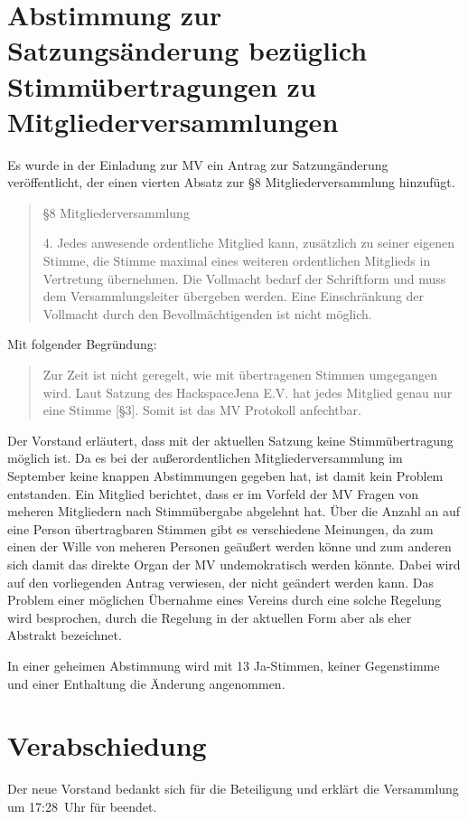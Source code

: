 \documentclass[DIV=calc,parksip=half*]{scrartcl}
\begin{document}
\section{Abstimmung zur Satzungsänderung bezüglich Stimmübertragungen zu Mitgliederversammlungen}
Es wurde in der Einladung zur MV ein Antrag zur Satzungänderung veröffentlicht, der einen vierten Absatz zur §8 Mitgliederversammlung hinzufügt.

\begin{quote}
§8 Mitgliederversammlung

4. Jedes anwesende ordentliche Mitglied kann, zusätzlich zu seiner eigenen Stimme, die Stimme maximal eines weiteren ordentlichen Mitglieds in Vertretung übernehmen.
Die Vollmacht bedarf der Schriftform und muss dem Versammlungsleiter übergeben werden.
Eine Einschränkung der Vollmacht durch den Bevollmächtigenden ist nicht möglich.
\end{quote}

Mit folgender Begründung: 
\begin{quote}
Zur Zeit ist nicht geregelt, wie mit übertragenen Stimmen umgegangen wird. Laut Satzung des HackspaceJena E.V. hat jedes Mitglied genau nur eine Stimme [§3]. Somit ist das MV Protokoll anfechtbar.
\end{quote}

Der Vorstand erläutert, dass mit der aktuellen Satzung keine Stimmübertragung möglich ist. Da es bei der außerordentlichen Mitgliederversammlung im September keine knappen Abstimmungen gegeben hat, ist damit kein Problem entstanden. Ein Mitglied berichtet, dass er im Vorfeld der MV Fragen von meheren Mitgliedern nach Stimmübergabe abgelehnt hat. Über die Anzahl an auf eine Person übertragbaren Stimmen gibt es verschiedene Meinungen, da zum einen der Wille von meheren Personen geäußert werden könne und zum anderen sich damit das direkte Organ der MV undemokratisch werden könnte. Dabei wird auf den vorliegenden Antrag verwiesen, der nicht geändert werden kann. Das Problem einer möglichen Übernahme eines Vereins durch eine solche Regelung wird besprochen, durch die Regelung in der aktuellen Form aber als eher Abstrakt bezeichnet.

In einer geheimen Abstimmung wird mit 13 Ja-Stimmen, keiner Gegenstimme und einer Enthaltung die Änderung angenommen.


\section{Verabschiedung}
Der neue Vorstand bedankt sich für die Beteiligung und erklärt die Versammlung um 17:28~Uhr für  beendet.
\end{document}
